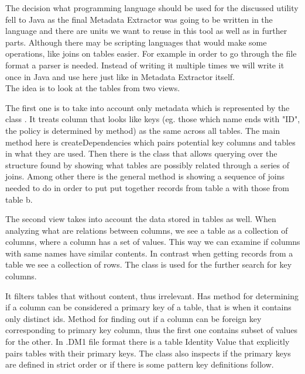 The decision what programming language should be used for the discussed utility fell to Java as the final Metadata Extractor was going to be written in the language and there are units we want to reuse in this tool as well as in further parts. Although there may be scripting languages that would make some operations, like joins on tables easier.
For example in order to go through the file format a parser is needed. Instead of writing it multiple times we will write it once in Java and use here just like in Metadata Extractor itself. \\

The idea is to look at the tables from two views.

The first one is to take into account only metadata which is represented by the class . It treats column that looks like keys (eg. those which name ends with "ID", the policy is determined by  method) as the same across all tables. 
The main method here is createDependencies which pairs potential key columns and tables in what they are used.
Then there is the class  that allows querying over the structure found by  showing what tables are possibly related through a series of joins.
Among other there is the general method  is showing a sequence of joins needed to do in order to put put together records from table a with those from table b.

The second view takes into account the data stored in tables as well. 
When analyzing what are relations between columns, we see a table as a collection of columns, where a column has a set of values. This way we can examine if columns with same names have similar contents.
In contrast when getting records from a table we see a collection of rows.
The  class is used for the further search for key columns.

It filters tables that without content, thus irrelevant.
Has method for determining if a column can be considered a primary key of a table, that is when it contains only distinct ids.
Method for finding out if a column can be foreign key corresponding to primary key column, thus the first one contains subset of values for the other.
In .DM1 file format there is a table Identity Value that explicitly pairs tables with their primary keys. 
The class also inspects if the primary keys are defined in strict order or if there is some pattern key definitions follow.

